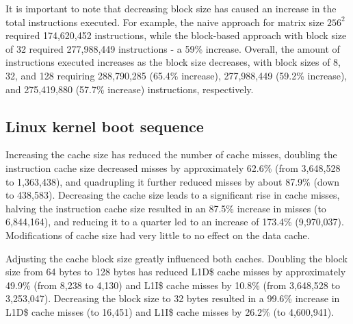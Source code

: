 \noindent It is important to note that decreasing block size has caused an increase in the total instructions executed. For example, the naive approach for matrix size \( 256^2 \) required
174,620,452 instructions, while the block-based approach with block size of 32 required 277,988,449 instructions - a 59\% increase. Overall, the amount of instructions executed
increases as the block size decreases, with block sizes of 8, 32, and 128 requiring 288,790,285 (65.4\% increase), 277,988,449 (59.2\% increase), and 275,419,880 (57.7\% increase)
instructions, respectively.

\subsection*{Linux kernel boot sequence}

Increasing the cache size has reduced the number of cache misses, doubling the instruction cache size decreased misses by approximately 62.6\% (from 3,648,528 to 1,363,438), and
quadrupling it further reduced misses by about 87.9\% (down to 438,583). Decreasing the cache size leads to a significant rise in cache misses, halving the instruction cache size
resulted in an 87.5\% increase in misses (to 6,844,164), and reducing it to a quarter led to an increase of 173.4\% (9,970,037). Modifications of cache size had very little to no
effect on the data cache.

Adjusting the cache block size greatly influenced both caches. Doubling the block size from 64 bytes to 128 bytes has reduced L1D\$ cache misses by approximately 49.9\% (from 8,238
to 4,130) and L1I\$ cache misses by 10.8\% (from 3,648,528 to 3,253,047). Decreasing the block size to 32 bytes resulted in a 99.6\% increase in L1D\$ cache misses (to 16,451) and
L1I\$ cache misses by 26.2\% (to 4,600,941).

